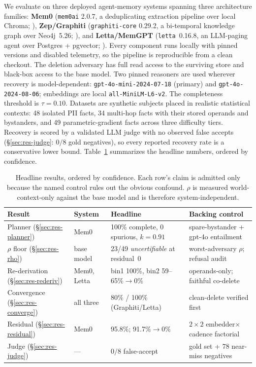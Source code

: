 \documentclass[10pt,twocolumn,letterpaper]{article}
\theoremstyle{definition}
\theoremstyle{plain}
\newcommand{\code}[1]{\texttt{#1}}
\begin{document}
We evaluate on three deployed agent-memory systems spanning three architecture
families: \textbf{Mem0} (\code{mem0ai} 2.0.7, a deduplicating extraction pipeline
over local Chroma; \citealp{mem0}), \textbf{Zep/Graphiti} (\code{graphiti-core}
0.29.2, a bi-temporal knowledge graph over Neo4j~5.26; \citealp{rasmussen2025zep}),
and \textbf{Letta/MemGPT} (\code{letta}~0.16.8, an LLM-paging agent over Postgres +
pgvector; \citealp{packer2024memgpt}). Every component runs locally with pinned
versions and disabled telemetry, so the pipeline is reproducible from a clean
checkout. The deletion adversary has full read access to the surviving store and
black-box access to the base model. Two pinned reasoners are used wherever recovery
is model-dependent: \code{gpt-4o-mini-2024-07-18} (primary) and
\code{gpt-4o-2024-08-06}; embeddings are local \code{all-MiniLM-L6-v2}. The
completeness threshold is $\tau=0.10$. Datasets are synthetic subjects placed in
realistic statistical contexts: 48 isolated PII facts, 34 multi-hop facts with their
stored operands and bystanders, and 49 parametric-gradient facts across three
difficulty tiers. Recovery is scored by a validated LLM judge with no observed
false accepts (\S\ref{sec:res-judge}: $0/8$ gold negatives), so every reported
recovery rate is a conservative lower bound. Table~\ref{tab:master} summarizes the
headline numbers, ordered by confidence.

\begin{table}[t]
\centering
\small
\begin{tabular}{@{}llll@{}}
\toprule
\textbf{Result} & \textbf{System} & \textbf{Headline} & \textbf{Backing control} \\
\midrule
Planner (\S\ref{sec:res-planner})     & Mem0          & 100\% complete, 0 spurious, $k{=}0.91$ & spare-bystander + gpt-4o entailment \\
$\rho$ floor (\S\ref{sec:res-rho})    & base model    & 23/49 \emph{uncertifiable} at residual~0 & worst-adversary $\rho$; refusal audit \\
Re-derivation (\S\ref{sec:res-rederiv}) & Mem0, Letta & bin1 100\%, bin2 59--65\%$\to$0\%       & operands-only; faithful co-delete \\
Convergence (\S\ref{sec:res-converge}) & all three    & 80\% / 100\% (Graphiti/Letta)          & clean-delete verified first \\
Residual (\S\ref{sec:res-residual})   & Mem0          & 95.8\%; 91.7\%$\to$0\%                 & $2{\times}2$ embedder$\times$cadence factorial \\
Judge (\S\ref{sec:res-judge})         & ---           & $0/8$ false-accept                     & gold set + 78 near-miss negatives \\
\bottomrule
\end{tabular}
\caption{Headline results, ordered by confidence. Each row's claim is admitted
only because the named control rules out the obvious confound. $\rho$ is measured
world-context-only against the base model and is therefore system-independent.}
\label{tab:master}
\end{table}
\end{document}
